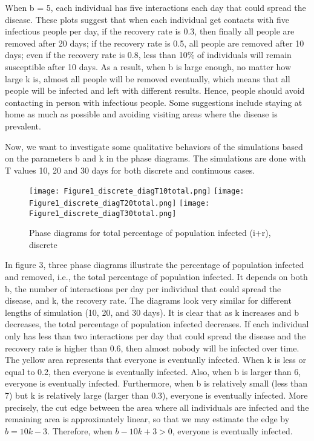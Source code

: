 \documentclass{article}
\begin{document}
When b = 5, each individual has five interactions each day that could spread the disease. These plots suggest that when each individual get contacts with five infectious people per day, if the recovery rate is 0.3, then finally all people are removed after 20 days; if the recovery rate is 0.5, all people are removed after 10 days; even if the recovery rate is 0.8, less than 10$\%$ of individuals will remain susceptible after 10 days. As a result, when b is large enough, no matter how large k is, almost all people will be removed eventually, which means that all people will be infected and left with different results. Hence, people should avoid contacting in person with infectious people. Some suggestions include staying at home as much as possible and avoiding visiting areas where the disease is prevalent.


Now, we want to investigate some qualitative behaviors of the simulations based on the parameters b and k in the phase diagrams.
The simulations are done with T values 10, 20 and 30 days for both discrete and continuous cases.


\begin{figure}[htp]

\centering
\texttt{[image: Figure1\_discrete\_diagT10total.png]}\hfill
\texttt{[image: Figure1\_discrete\_diagT20total.png]}\hfill
\texttt{[image: Figure1\_discrete\_diagT30total.png]}

\caption{Phase diagrams for total percentage of population infected (i+r), discrete}
\label{fig:figure3}

\end{figure}



In figure 3, three phase diagrams illustrate the percentage of population infected and removed, i.e., the total percentage of population infected. It depends on both b, the number of interactions per day per individual that could spread the disease, and k, the recovery rate. The diagrams look very similar for different lengths of simulation (10, 20, and 30 days). It is clear that as k increases and b decreases, the total percentage of population infected decreases. If each individual only has less than two interactions per day that could spread the disease and the recovery rate is higher than 0.6, then almost nobody will be infected over time. The yellow area represents that everyone is eventually infected. When k is less or equal to 0.2, then everyone is eventually infected. Also, when b is larger than 6, everyone is eventually infected. Furthermore, when b is relatively small (less than 7) but k is relatively large (larger than 0.3), everyone is eventually infected. More precisely, the cut edge between the area where all individuals are infected and the remaining area is approximately linear, so that we may estimate the edge by $b = 10k - 3$. Therefore, when $b - 10k + 3 > 0$, everyone is eventually infected.
\end{document}
